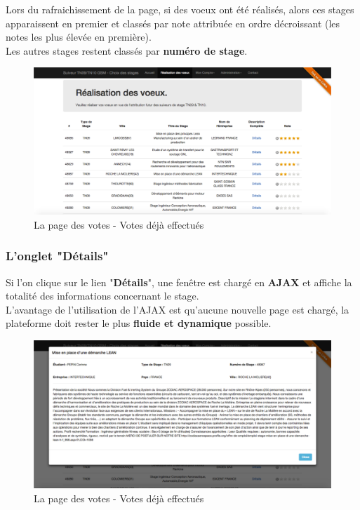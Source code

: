 \documentclass[a4paper,titlepage]{scrartcl}
\begin{document}
Lors du rafraichissement de la page, si des voeux ont été réalisés, alors ces stages apparaissent en premier et classés par note attribuée en ordre décroissant (les notes les plus élevée en première).\\
Les autres stages restent classés par \textbf{numéro de stage}.\\

\begin{figure}[H]
	\vspace{-3mm}
	\begin{center}
		\includegraphics[scale=0.3]{Images/vote_2.png}
		\caption{La page des votes - Votes déjà effectués}
	\end{center}
\end{figure}

\subsubsection{L'onglet "Détails"}

Si l'on clique sur le lien "\textbf{Détails}", une fenêtre est chargé en \textbf{AJAX} et affiche la totalité des informations concernant le stage.\\
L'avantage de l'utilisation de l'AJAX est qu'aucune nouvelle page est chargé, la plateforme doit rester le plus \textbf{fluide et dynamique} possible.\\

\begin{figure}[H]
	\vspace{-3mm}
	\begin{center}
		\includegraphics[scale=0.3]{Images/vote_detail.png}
		\caption{La page des votes - Votes déjà effectués}
	\end{center}
	\vspace{-2cm}
\end{figure}
\end{document}
